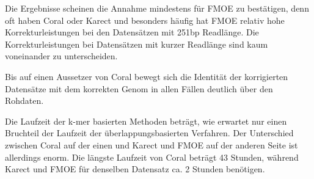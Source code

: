 Die Ergebnisse scheinen die Annahme mindestens für FMOE zu bestätigen, denn oft haben Coral oder Karect und besonders häufig hat FMOE relativ hohe Korrekturleistungen bei den Datensätzen mit 251bp Readlänge.
Die Korrekturleistungen bei Datensätzen mit kurzer Readlänge sind kaum voneinander zu unterscheiden.

Bis auf einen Aussetzer von Coral bewegt sich die Identität der korrigierten Datensätze mit dem korrekten Genom in allen Fällen deutlich über den Rohdaten.

Die Laufzeit der k-mer basierten Methoden beträgt, wie erwartet nur einen Bruchteil der Laufzeit der überlappungsbasierten Verfahren.
Der Unterschied zwischen Coral auf der einen und Karect und FMOE auf der anderen Seite ist allerdings enorm.
Die längste Laufzeit von Coral beträgt 43 Stunden, während Karect und FMOE für denselben Datensatz ca. 2 Stunden benötigen.
